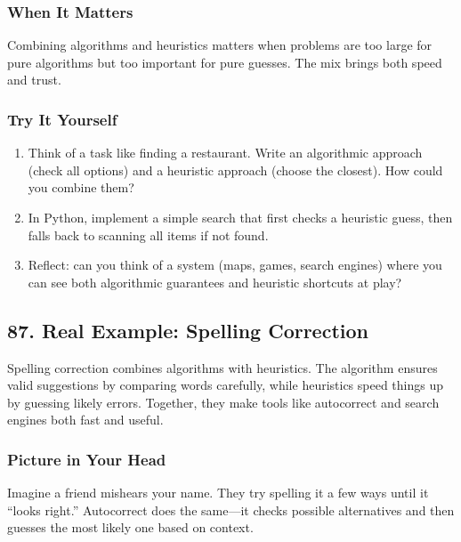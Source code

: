 \documentclass[
  letterpaper,
  DIV=11,
  numbers=noendperiod]{scrreprt}
\providecommand{\tightlist}{%
  \setlength{\itemsep}{0pt}\setlength{\parskip}{0pt}}
\begin{document}
\subsubsection{When It Matters}\label{when-it-matters-84}

Combining algorithms and heuristics matters when problems are too large
for pure algorithms but too important for pure guesses. The mix brings
both speed and trust.

\subsubsection{Try It Yourself}\label{try-it-yourself-86}

\begin{enumerate}
\def\labelenumi{\arabic{enumi}.}
\tightlist
\item
  Think of a task like finding a restaurant. Write an algorithmic
  approach (check all options) and a heuristic approach (choose the
  closest). How could you combine them?
\item
  In Python, implement a simple search that first checks a heuristic
  guess, then falls back to scanning all items if not found.
\item
  Reflect: can you think of a system (maps, games, search engines) where
  you can see both algorithmic guarantees and heuristic shortcuts at
  play?
\end{enumerate}

\subsection{87. Real Example: Spelling
Correction}\label{real-example-spelling-correction}

Spelling correction combines algorithms with heuristics. The algorithm
ensures valid suggestions by comparing words carefully, while heuristics
speed things up by guessing likely errors. Together, they make tools
like autocorrect and search engines both fast and useful.

\subsubsection{Picture in Your Head}\label{picture-in-your-head-87}

Imagine a friend mishears your name. They try spelling it a few ways
until it ``looks right.'' Autocorrect does the same---it checks possible
alternatives and then guesses the most likely one based on context.
\end{document}
